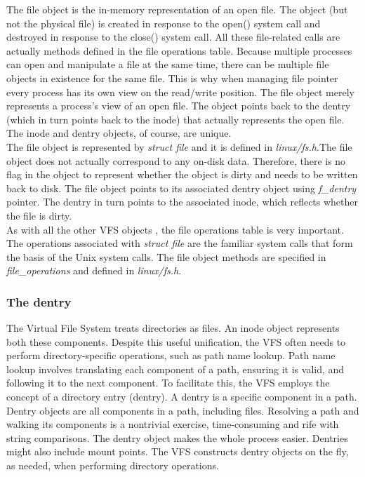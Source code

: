\documentclass[conference]{IEEEtran}
\begin{document}
The file object is the in-memory representation of an open file. The object (but not the physical file)
is created in response to the open() system call and destroyed in response to the close() system call. 
All these file-related calls are actually methods defined in the file operations table. Because multiple 
processes can open and manipulate a file at the same time, there can be multiple file objects in existence
for the same file. This is why when managing file pointer every process has its own view on the read/write
position. The file object merely represents a process's view of an open file. 
The object points back to the dentry (which in turn points back to the inode) that actually represents the
open file. The inode and dentry objects, of course, are unique.\\

The file object is represented by {\em struct file} and it is defined in {\em linux/fs.h}.The file object does not
actually correspond to any on-disk data. Therefore, there is no flag in the object to represent whether the 
object is dirty and needs to be written back to disk. The file object points to its associated dentry object using
{\em f\_dentry} pointer. The dentry in turn points to the associated inode, which reflects whether the file is dirty.\\
As with all the other VFS objects , the file operations table is very important. The operations associated 
with {\em struct file} are the familiar system calls that form the basis of the Unix system calls. The file object
methods are specified in {\em file\_operations} and defined in {\em linux/fs.h}. \\

\subsubsection{The dentry}
The Virtual File System treats directories as files. An inode object represents both these components. 
Despite this useful unification, the VFS often needs to perform directory-specific operations, such as path 
name lookup. Path name lookup involves translating each component of a path, ensuring it is valid, and following 
it to the next component. To facilitate this, the VFS employs the concept of a directory entry (dentry). 
A dentry is a specific component in a path. Dentry objects are all components in a path, including files. 
Resolving a path and walking its components is a nontrivial exercise, time-consuming and rife with string 
comparisons. The dentry object makes the whole process easier.
Dentries might also include mount points. The VFS constructs dentry objects on the fly, as needed, 
when performing directory operations.\\
\end{document}
